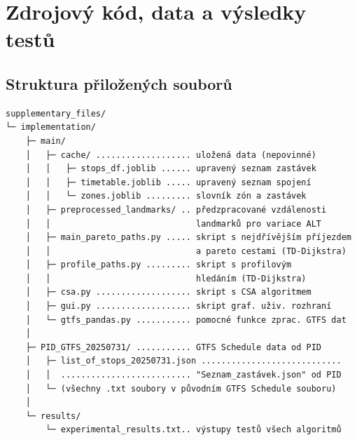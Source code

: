 \documentclass[twoside]{ctuthesis}
\theoremstyle{plain}
\theoremstyle{definition}
\theoremstyle{note}
\begin{document}
\maketitle





\printindex


\newpage

%

\sloppy
\printbibliography

\appendix
\chapter{Zdrojový kód, data a výsledky testů}

\label{appendix_main}
\section{Struktura přiložených souborů}
\label{appendix_org}

{\small
\begin{verbatim}
supplementary_files/
└─ implementation/
    ├─ main/
    │   ├─ cache/ ................... uložená data (nepovinné)
    │   │   ├─ stops_df.joblib ...... upravený seznam zastávek
    │   │   ├─ timetable.joblib ..... upravený seznam spojení
    │   │   └─ zones.joblib ......... slovník zón a zastávek
    │   ├─ preprocessed_landmarks/ .. předzpracované vzdálenosti 
    │   │                             landmarků pro variace ALT 
    │   ├─ main_pareto_paths.py ..... skript s nejdřívějším příjezdem
    │   │                             a pareto cestami (TD-Dijkstra)
    │   ├─ profile_paths.py ......... skript s profilovým
    │   │                             hledáním (TD-Dijkstra)
    │   ├─ csa.py ................... skript s CSA algoritmem
    │   ├─ gui.py ................... skript graf. uživ. rozhraní
    │   └─ gtfs_pandas.py ........... pomocné funkce zprac. GTFS dat
    │
    ├─ PID_GTFS_20250731/ ........... GTFS Schedule data od PID
    │   ├─ list_of_stops_20250731.json ............................
    │   │  .......................... "Seznam_zastávek.json" od PID
    │   └─ (všechny .txt soubory v původním GTFS Schedule souboru)
    │
    └─ results/
        └─ experimental_results.txt.. výstupy testů všech algoritmů
\end{verbatim}
}



\end{document}
